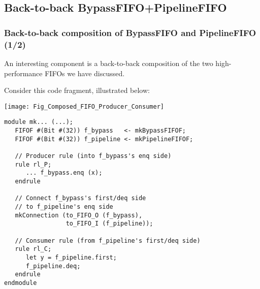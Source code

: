 \subsection{Back-to-back BypassFIFO+PipelineFIFO}

\begin{frame}[fragile]
\frametitle{Back-to-back composition of BypassFIFO and PipelineFIFO (1/2)}

\label{slide_back_to_back_fifos}

\footnotesize

\begin{minipage}{0.5\textwidth}
An interesting component is a back-to-back composition of the two
high-performance FIFOs we have discussed.

\vspace{2ex}

Consider this code fragment, illustrated below:

\vspace{5ex}

\begin{center}
  \texttt{[image: Fig\_Composed\_FIFO\_Producer\_Consumer]}
\end{center}


\end{minipage}
\hm
\begin{minipage}{0.47\textwidth}\scriptsize
\begin{Verbatim}[frame=single]
module mk... (...);
   FIFOF #(Bit #(32)) f_bypass   <- mkBypassFIFOF;
   FIFOF #(Bit #(32)) f_pipeline <- mkPipelineFIFOF;

   // Producer rule (into f_bypass's enq side)
   rule rl_P;
      ... f_bypass.enq (x);
   endrule

   // Connect f_bypass's first/deq side
   // to f_pipeline's enq side
   mkConnection (to_FIFO_O (f_bypass),
                 to_FIFO_I (f_pipeline));

   // Consumer rule (from f_pipeline's first/deq side)
   rule rl_C;
      let y = f_pipeline.first;
      f_pipeline.deq;
   endrule
endmodule
\end{Verbatim}
\end{minipage}

\end{frame}


